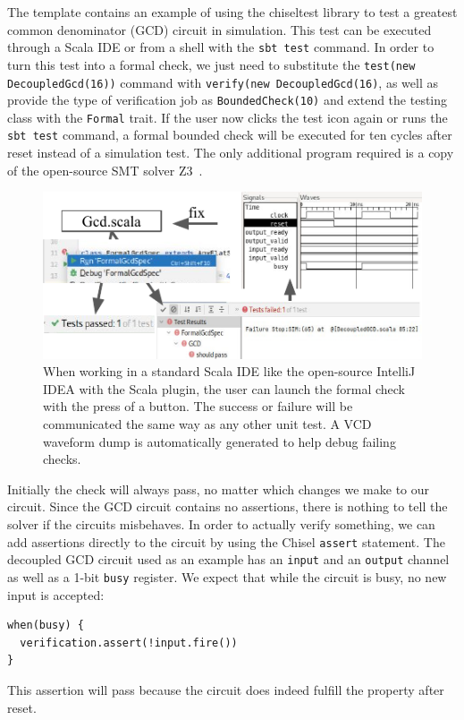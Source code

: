 \documentclass[conference]{IEEEtran}
\newcommand{\code}[1]{{\small{\texttt{#1}}}}
\begin{document}
The template contains an example of using the chiseltest library to test a greatest common denominator (GCD) circuit in simulation.
This test can be executed through a Scala IDE or from a shell with the \code{sbt test} command.
In order to turn this test into a formal check, we just need to substitute the \code{test(new DecoupledGcd(16))}
command with \code{verify(new DecoupledGcd(16)}, as well as provide the type of verification job as
\code{BoundedCheck(10)} and extend the testing class with the \code{Formal} trait.
If the user now clicks the test icon again or runs the \code{sbt test} command, a formal bounded check will
be executed for ten cycles after reset instead of a simulation test.
The only additional program required is a copy of the open-source SMT solver Z3~\cite{de2008z3}.



\begin{figure}
\centering
\includegraphics{woset_formal_ide_flow.pdf}
\caption{When working in a standard Scala IDE like the open-source IntelliJ IDEA with the Scala plugin, the user can launch the formal check with the press of a button.
The success or failure will be communicated the same way as any other unit test. A VCD waveform dump is automatically generated to help debug failing checks.}
\label{fig:ide-flow}
\end{figure}

Initially the check will always pass, no matter which changes we make to our circuit.
Since the GCD circuit contains no assertions, there is nothing to tell the solver if the circuits misbehaves.
In order to actually verify something, we can add assertions directly to the circuit by using the
Chisel \code{assert} statement.
The decoupled GCD circuit used as an example has an \code{input} and an \code{output} channel
as well as a 1-bit \code{busy} register.
We expect that while the circuit is busy, no new input is accepted:
\begin{verbatim}
when(busy) {
  verification.assert(!input.fire())
}
\end{verbatim}
This assertion will pass because the circuit does indeed fulfill the property after reset.
\end{document}
